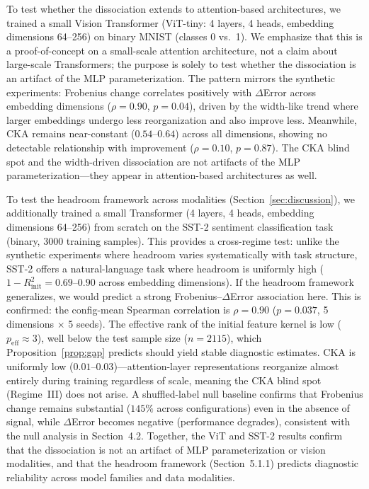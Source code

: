 \documentclass[10pt]{article}
\begin{document}
To test whether the dissociation extends to attention-based architectures, we trained a small Vision Transformer (ViT-tiny: 4 layers, 4 heads, embedding dimensions 64--256) on binary MNIST (classes 0 vs.\ 1). We emphasize that this is a proof-of-concept on a small-scale attention architecture, not a claim about large-scale Transformers; the purpose is solely to test whether the dissociation is an artifact of the MLP parameterization. The pattern mirrors the synthetic experiments: Frobenius change correlates positively with $\Delta$Error across embedding dimensions ($\rho=0.90$, $p=0.04$), driven by the width-like trend where larger embeddings undergo less reorganization and also improve less. Meanwhile, CKA remains near-constant ($0.54$--$0.64$) across all dimensions, showing no detectable relationship with improvement ($\rho=0.10$, $p=0.87$). The CKA blind spot and the width-driven dissociation are not artifacts of the MLP parameterization---they appear in attention-based architectures as well.

To test the headroom framework across modalities (Section~\ref{sec:discussion}), we additionally trained a small Transformer (4 layers, 4 heads, embedding dimensions 64--256) from scratch on the SST-2 sentiment classification task (binary, 3000 training samples). This provides a cross-regime test: unlike the synthetic experiments where headroom varies systematically with task structure, SST-2 offers a natural-language task where headroom is uniformly high ($1-R^2_{\text{init}} = 0.69$--$0.90$ across embedding dimensions). If the headroom framework generalizes, we would predict a strong Frobenius--$\Delta$Error association here. This is confirmed: the config-mean Spearman correlation is $\rho=0.90$ ($p=0.037$, 5 dimensions $\times$ 5 seeds). The effective rank of the initial feature kernel is low ($p_{\text{eff}} \approx 3$), well below the test sample size ($n=2115$), which Proposition~\ref{prop:gap} predicts should yield stable diagnostic estimates. CKA is uniformly low ($0.01$--$0.03$)---attention-layer representations reorganize almost entirely during training regardless of scale, meaning the CKA blind spot (Regime~III) does not arise. A shuffled-label null baseline confirms that Frobenius change remains substantial ($145\%$ across configurations) even in the absence of signal, while $\Delta$Error becomes negative (performance degrades), consistent with the null analysis in Section~4.2. Together, the ViT and SST-2 results confirm that the dissociation is not an artifact of MLP parameterization or vision modalities, and that the headroom framework (Section~5.1.1) predicts diagnostic reliability across model families and data modalities.
\end{document}
